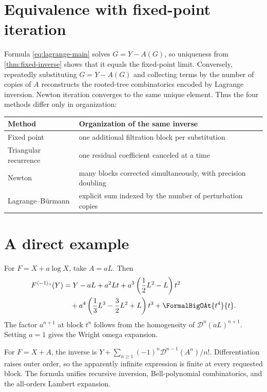 \documentclass[11pt,oneside]{book}
\theoremstyle{definition}
\theoremstyle{remark}
\newcommand{\D}{\mathcal D}
\newcommand{\compinv}{^{\langle-1\rangle_{\circ}}}
\begin{document}
\section{Equivalence with fixed-point iteration}
Formula \eqref{eq:lagrange-main} solves
$G=Y-A(G)$, so uniqueness from \cref{thm:fixed-inverse} shows that it equals
the fixed-point limit.  Conversely, repeatedly substituting
$G=Y-A(G)$ and collecting terms by the number of copies of $A$ reconstructs
the rooted-tree combinatorics encoded by Lagrange inversion.  Newton iteration
converges to the same unique element.  Thus the four methods differ only in
organization:
\begin{center}
\begin{tabularx}{0.95\textwidth}{@{}lX@{}}
\toprule
Method & Organization of the same inverse \\
\midrule
Fixed point & one additional filtration block per substitution \\
Triangular recurrence & one residual coefficient canceled at a time \\
Newton & many blocks corrected simultaneously, with precision doubling \\
Lagrange--B\"urmann & explicit sum indexed by the number of perturbation copies \\
\bottomrule
\end{tabularx}
\end{center}

\section{A direct example}
For $F=X+a\log X$, take $A=aL$.  Then
\begin{align*}
 F\compinv(Y)
 &=Y-aL+a^2Lt
 +a^3\left(\frac12L^2-L\right)t^2\\
 &\quad+a^4\left(\frac13L^3-\frac32L^2+L\right)t^3
 +\FormalBigOAt{t^4}{t}.
\end{align*}
The factor $a^{n+1}$ at block $t^n$ follows from the homogeneity of
$\D^{n}(aL)^{n+1}$.  Setting $a=1$ gives the Wright omega expansion.

\begin{summarybox}
For $F=X+A$, the inverse is
$Y+\sum_{n\ge1}(-1)^n\D^{n-1}(A^n)/n!$.  Differentiation raises outer order,
so the apparently infinite expression is finite at every requested block.
The formula unifies recursive inversion, Bell-polynomial combinatorics, and
the all-orders Lambert expansion.
\end{summarybox}
\end{document}

